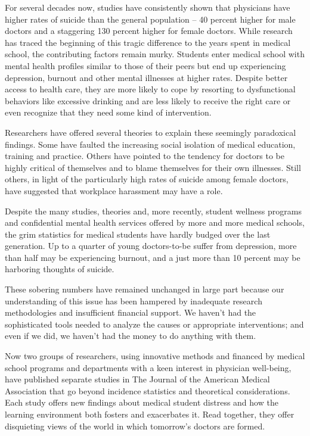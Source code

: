 ﻿\documentclass[12pt]{article}
\begin{document}
For several decades now, studies have consistently shown that physicians have higher rates of
suicide than the general population -- 40 percent higher for male doctors and a staggering 130
percent higher for female doctors. While research has traced the beginning of this tragic difference
to the years spent in medical school, the contributing factors remain murky. Students enter medical
school with mental health profiles similar to those of their peers but end up experiencing
depression, burnout and other mental illnesses at higher rates. Despite better access to health
care, they are more likely to cope by resorting to dysfunctional behaviors like excessive drinking
and are less likely to receive the right care or even recognize that they need some kind of
intervention.

Researchers have offered several theories to explain these seemingly paradoxical findings. Some have
faulted the increasing social isolation of medical education, training and practice. Others have
pointed to the tendency for doctors to be highly critical of themselves and to blame themselves for
their own illnesses. Still others, in light of the particularly high rates of suicide among female
doctors, have suggested that workplace harassment may have a role.

Despite the many studies, theories and, more recently, student wellness programs and confidential
mental health services offered by more and more medical schools, the grim statistics for medical
students have hardly budged over the last generation. Up to a quarter of young doctors-to-be suffer
from depression, more than half may be experiencing burnout, and a just more than 10 percent may be
harboring thoughts of suicide.

These sobering numbers have remained unchanged in large part because our understanding of this issue
has been hampered by inadequate research methodologies and insufficient financial support. We
haven't had the sophisticated tools needed to analyze the causes or appropriate interventions; and
even if we did, we haven't had the money to do anything with them.

Now two groups of researchers, using innovative methods and financed by medical school programs and
departments with a keen interest in physician well-being, have published separate studies in The
Journal of the American Medical Association that go beyond incidence statistics and theoretical
considerations. Each study offers new findings about medical student distress and how the learning
environment both fosters and exacerbates it. Read together, they offer disquieting views of the
world in which tomorrow's doctors are formed.
\end{document}
